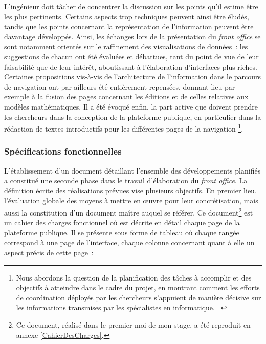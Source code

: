 \documentclass[a4paper,12pt,twoside]{book}
\newcommand{\eng}{\emph}
\newcommand{\fo}{\eng{front office}\xspace}
\newcommand{\g}[1]{\og#1~\fg}
\begin{document}
L'ingénieur doit tâcher de concentrer la discussion sur les points qu'il estime être les plus pertinents. Certains aspects trop techniques peuvent ainsi être éludés, tandis que les points concernant la représentation de l'information peuvent être davantage développés. Ainsi, les échanges lors de la présentation du \fo se sont notamment orientés sur le raffinement des visualisations de données~: les suggestions de chacun ont été évaluées et débattues, tant du point de vue de leur faisabilité que de leur intérêt, aboutissant à l'élaboration d'interfaces plus riches. Certaines propositions vis-à-vis de l'architecture de l'information dans le parcours de navigation ont par ailleurs été entièrement repensées, donnant lieu par exemple à la fusion des pages concernant les éditions et de celles relatives aux modèles mathématiques. Il a été évoqué enfin, la part active que doivent prendre les chercheurs dans la conception de la plateforme publique, en particulier dans la rédaction de textes introductifs pour les différentes pages de la navigation \footnote{\g{Nous abordons la question de la planification des tâches à accomplir et des objectifs à atteindre dans le cadre du projet, en montrant comment les efforts de coordination déployés par les chercheurs s’appuient de manière décisive sur les informations transmises par les spécialistes en informatique.} \cite[§~5]{oberhauserCollaborationsEquivoques2016}}.

				\subsubsection{Spécifications fonctionnelles}
L'établissement d'un document détaillant l'ensemble des développements planifiés a constitué une seconde phase dans le travail d'élaboration du \fo. La définition écrite des réalisations prévues vise plusieurs objectifs. En premier lieu, l'évaluation globale des moyens à mettre en œuvre pour leur concrétisation, mais aussi la constitution d'un document maître auquel se référer. Ce document\footnote{Ce document, réalisé dans le premier moi de mon stage, a été reproduit en annexe \ref{CahierDesCharges}.} est un cahier des charges fonctionnel où est décrite en détail chaque page de la plateforme publique. Il se présente sous forme de tableau où chaque rangée correspond à une page de l'interface, chaque colonne concernant quant à elle un aspect précis de cette page~:
\end{document}
